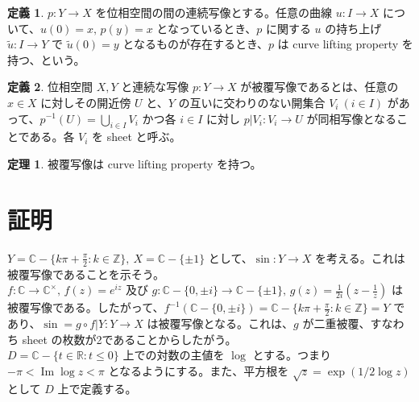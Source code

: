 \documentclass{jsarticle}
\theoremstyle{definition}
\newtheorem*{definition*}{定義}
\newtheorem{theorem}{定理}
\begin{document}
    \vspace{1.0ex}
    
    \begin{definition*}
        $p : Y \rightarrow X$ を位相空間の間の連続写像とする。任意の曲線 $u : I \rightarrow X$ について、$u(0) = x, \, p(y) = x$ となっているとき、$p$ に関する $u$ の持ち上げ $\widetilde{u} : I \rightarrow Y$ で $\widetilde{u}(0) = y$ となるものが存在するとき、$p$ は curve lifting property を持つ、という。
    \end{definition*}
    
    \begin{definition*}
        位相空間 $X, Y$ と連続な写像 $p : Y \rightarrow X$ が被覆写像であるとは、任意の $x \in X$ に対しその開近傍 $U$ と、$Y$ の互いに交わりのない開集合 $V_i \ (i \in I)$ があって、$\displaystyle p^{-1}(U) = \bigcup_{i \in I} V_i$ かつ各 $i \in I$ に対し $p|V_i : V_i \rightarrow U$ が同相写像となることである。各 $V_i$ を sheet と呼ぶ。
    \end{definition*}
    
    \begin{theorem}
        被覆写像は curve lifting property を持つ。
    \end{theorem}
    
    \section*{証明}
    $\displaystyle Y = \mathbb{C} - \{k\pi + \frac{\pi}{2} : k \in \mathbb{Z}\}, \ X = \mathbb{C} - \{\pm1\}$ として、$\sin : Y \rightarrow X$ を考える。これは被覆写像であることを示そう。\\

    $f : \mathbb{C} \rightarrow \mathbb{C}^{\times}, \, f(z) = e^{iz}$ 及び $\displaystyle g : \mathbb{C}-\{0, \pm i\} \rightarrow \mathbb{C} - \{\pm 1\}, \, g(z) = \frac{1}{2i}\left(z - \frac{1}{z}\right)$ は被覆写像である。したがって、$\displaystyle f^{-1}(\mathbb{C}-\{0, \pm i\}) = \mathbb{C} - \{k\pi +  \frac{\pi}{2} : k \in \mathbb{Z}\} = Y$ であり、$\sin = g \circ f|Y : Y \rightarrow X$ は被覆写像となる。これは、$g$ が二重被覆、すなわち sheet の枚数が2であることからしたがう。\\
    
    $D = \mathbb{C} - \{t \in \mathbb{R} : t \leq 0\}$ 上での対数の主値を $\log$ とする。つまり $-\pi < \operatorname{Im} \log z < \pi$ となるようにする。また、平方根を $\sqrt{z} = \exp(1/2 \log z)$ として $D$ 上で定義する。\\
    
\end{document}
